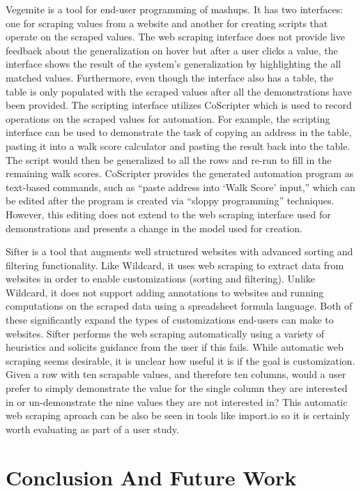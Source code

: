 \documentclass[sigconf,10pt]{acmart}
\begin{document}
Vegemite \citep{lin2009} is a tool for end-user programming of mashups.
It has two interfaces: one for scraping values from a website and
another for creating scripts that operate on the scraped values. The web
scraping interface does not provide live feedback about the
generalization on hover but after a user clicks a value, the interface
shows the result of the system's generalization by highlighting the all
matched values. Furthermore, even though the interface also has a table,
the table is only populated with the scraped values after all the
demonstrations have been provided. The scripting interface utilizes
CoScripter \citep{leshed2008} which is used to record operations on the
scraped values for automation. For example, the scripting interface can
be used to demonstrate the task of copying an address in the table,
pasting it into a walk score calculator and pasting the result back into
the table. The script would then be generalized to all the rows and
re-run to fill in the remaining walk scores. CoScripter provides the
generated automation program as text-based commands, such as ``paste
address into `Walk Score' input,'' which can be edited after the program
is created via ``sloppy programming'' \citep{lin2009} techniques.
However, this editing does not extend to the web scraping interface used
for demonstrations and presents a change in the model used for creation.

Sifter \citep{huynh2006} is a tool that augments well structured
websites with advanced sorting and filtering functionality. Like
Wildcard, it uses web scraping to extract data from websites in order to
enable customizations (sorting and filtering). Unlike Wildcard, it does
not support adding annotations to websites and running computations on
the scraped data using a spreadsheet formula language. Both of these
significantly expand the types of customizations end-users can make to
websites. Sifter performs the web scraping automatically using a variety
of heuristics and solicits guidance from the user if this fails. While
automatic web scraping seems desirable, it is unclear how useful it is
if the goal is customization. Given a row with ten scrapable values, and
therefore ten columns, would a user prefer to simply demonstrate the
value for the single column they are interested in or un-demonstrate the
nine values they are not interested in? This automatic web scraping
aproach can be also be seen in tools like import.io \citep{zotero-77} so
it is certainly worth evaluating as part of a user study.

\hypertarget{sec:conclusion}{%
\section{Conclusion And Future Work}\label{sec:conclusion}}
\end{document}
